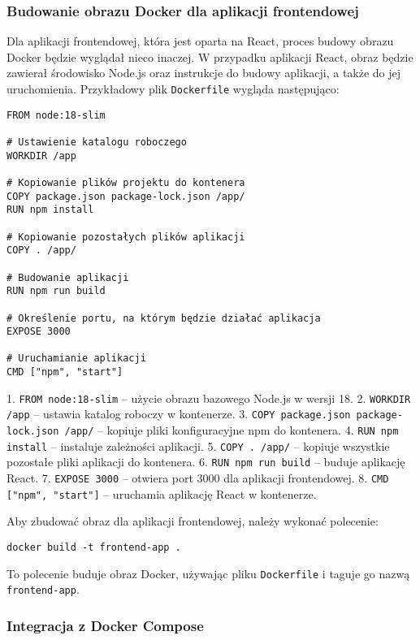 \subsubsection{Budowanie obrazu Docker dla aplikacji frontendowej}

Dla aplikacji frontendowej, która jest oparta na React, proces budowy obrazu Docker będzie wyglądał nieco inaczej. W przypadku aplikacji React, obraz będzie zawierał środowisko Node.js oraz instrukcje do budowy aplikacji, a także do jej uruchomienia. Przykładowy plik \texttt{Dockerfile} wygląda następująco:

\begin{verbatim}
FROM node:18-slim

# Ustawienie katalogu roboczego
WORKDIR /app

# Kopiowanie plików projektu do kontenera
COPY package.json package-lock.json /app/
RUN npm install

# Kopiowanie pozostałych plików aplikacji
COPY . /app/

# Budowanie aplikacji
RUN npm run build

# Określenie portu, na którym będzie działać aplikacja
EXPOSE 3000

# Uruchamianie aplikacji
CMD ["npm", "start"]
\end{verbatim}

1. \texttt{FROM node:18-slim} – użycie obrazu bazowego Node.js w wersji 18.
2. \texttt{WORKDIR /app} – ustawia katalog roboczy w kontenerze.
3. \texttt{COPY package.json package-lock.json /app/} – kopiuje pliki konfiguracyjne npm do kontenera.
4. \texttt{RUN npm install} – instaluje zależności aplikacji.
5. \texttt{COPY . /app/} – kopiuje wszystkie pozostałe pliki aplikacji do kontenera.
6. \texttt{RUN npm run build} – buduje aplikację React.
7. \texttt{EXPOSE 3000} – otwiera port 3000 dla aplikacji frontendowej.
8. \texttt{CMD ["npm", "start"]} – uruchamia aplikację React w kontenerze.

Aby zbudować obraz dla aplikacji frontendowej, należy wykonać polecenie:

\begin{verbatim}
docker build -t frontend-app .
\end{verbatim}

To polecenie buduje obraz Docker, używając pliku \texttt{Dockerfile} i taguje go nazwą \texttt{frontend-app}.

\subsubsection{Integracja z Docker Compose}

